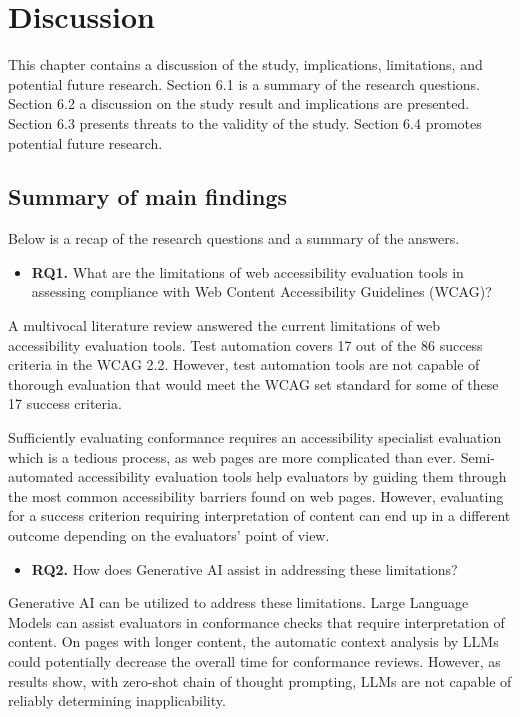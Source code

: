 \chapter{Discussion\label{discussion}}

This chapter contains a discussion of the study, implications, limitations, and potential future research. Section 6.1 is a summary of the research questions. Section 6.2 a discussion on the study result and implications are presented. Section 6.3 presents threats to the validity of the study. Section 6.4 promotes potential future research.

\section{Summary of main findings}

Below is a recap of the research questions and a summary of the answers.

\begin{itemize}
    \item \textbf{RQ1.} What are the limitations of web accessibility evaluation tools in assessing compliance with Web Content Accessibility Guidelines (WCAG)?
\end{itemize}

    A multivocal literature review answered the current limitations of web accessibility evaluation tools. Test automation covers 17 out of the 86 success criteria in the WCAG 2.2. However, test automation tools are not capable of thorough evaluation that would meet the WCAG set standard for some of these 17 success criteria. 

    Sufficiently evaluating conformance requires an accessibility specialist evaluation which is a tedious process, as web pages are more complicated than ever. Semi-automated accessibility evaluation tools help evaluators by guiding them through the most common accessibility barriers found on web pages. However, evaluating for a success criterion requiring interpretation of content can end up in a different outcome depending on the evaluators' point of view.
    
\begin{itemize}
    \item \textbf{RQ2.} How does Generative AI assist in addressing these limitations?
\end{itemize}

    Generative AI can be utilized to address these limitations. Large Language Models can assist evaluators in conformance checks that require interpretation of content. On pages with longer content, the automatic context analysis by LLMs could potentially decrease the overall time for conformance reviews. However, as results show, with zero-shot chain of thought prompting, LLMs are not capable of reliably determining inapplicability.

